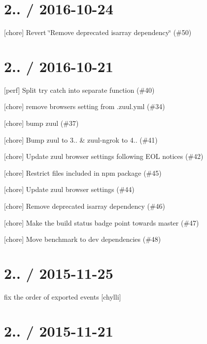 \section*{2.. / 2016-\/10-\/24 }


\begin{DoxyItemize}
\item \mbox{[}chore\mbox{]} Revert \char`\"{}\+Remove deprecated isarray dependency\char`\"{} (\#50)
\end{DoxyItemize}

\section*{2.. / 2016-\/10-\/21 }


\begin{DoxyItemize}
\item \mbox{[}perf\mbox{]} Split try catch into separate function (\#40)
\item \mbox{[}chore\mbox{]} remove browsers setting from .zuul.\+yml (\#34)
\item \mbox{[}chore\mbox{]} bump zuul (\#37)
\item \mbox{[}chore\mbox{]} Bump zuul to 3.. \& zuul-\/ngrok to 4.. (\#41)
\item \mbox{[}chore\mbox{]} Update zuul browser settings following E\+OL notices (\#42)
\item \mbox{[}chore\mbox{]} Restrict files included in npm package (\#45)
\item \mbox{[}chore\mbox{]} Update zuul browser settings (\#44)
\item \mbox{[}chore\mbox{]} Remove deprecated isarray dependency (\#46)
\item \mbox{[}chore\mbox{]} Make the build status badge point towards master (\#47)
\item \mbox{[}chore\mbox{]} Move benchmark to dev dependencies (\#48)
\end{DoxyItemize}

\section*{2.. / 2015-\/11-\/25 }


\begin{DoxyItemize}
\item fix the order of exported events \mbox{[}chylli\mbox{]}
\end{DoxyItemize}

\section*{2.. / 2015-\/11-\/21 }


